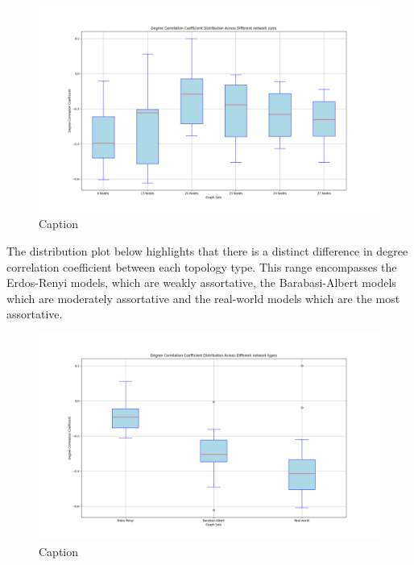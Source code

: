 \begin{figure}
    \centering
    \includegraphics[width=0.9\linewidth]{images/FINAL-TOPO-COMP/Degree-coeff-distrib/Distrib-by-size.png}
    \caption{Caption}
    \label{fig:enter-label}
\end{figure}

The distribution plot below highlights that there is a distinct difference in degree correlation coefficient between each topology type. This range encompasses the Erdos-Renyi models, which are weakly assortative, the Barabasi-Albert models which are moderately assortative and the real-world models which are the most assortative. 

\begin{figure}
    \centering
    \includegraphics[width=0.9\linewidth]{images/FINAL-TOPO-COMP/Degree-coeff-distrib/Distrib-by-type.png}
    \caption{Caption}
    \label{fig:enter-label}
\end{figure}

